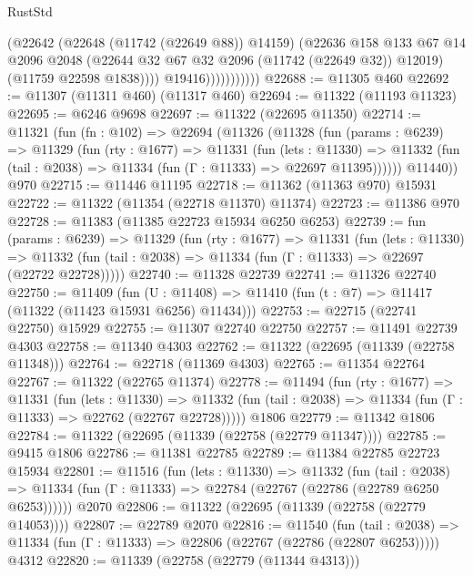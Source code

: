 \begin{lexlean}{RustStd}
\begin{coremodule}
                            (@22642
                              (@22648 (@11742 (@22649 @88)) @14159)
                              (@22636
                                @158
                                @133
                                @67
                                @14
                                @2096
                                @2048
                                (@22644 @32 @67 @32 @2096 (@11742 (@22649 @32)) @12019)
                                (@11759 @22598 @1838))))
                          @19416)))))))))))
@22688 := @11305 @460
@22692 := @11307 (@11311 @460) (@11317 @460)
@22694 := @11322 (@11193 @11323)
@22695 := @6246 @9698
@22697 := @11322 (@22695 @11350)
@22714 := @11321
    (fun (fn : @102) =>
    @22694
      (@11326
        (@11328
          (fun (params : @6239) =>
          @11329
            (fun (rty : @1677) =>
            @11331
              (fun (lets : @11330) =>
              @11332 (fun (tail : @2038) => @11334 (fun (Γ : @11333) => @22697 @11395))))))
        @11440))
    @970
@22715 := @11446 @11195
@22718 := @11362 (@11363 @970) @15931
@22722 := @11322 (@11354 (@22718 @11370) @11374)
@22723 := @11386 @970
@22728 := @11383 (@11385 @22723 @15934 @6250 @6253)
@22739 := fun (params : @6239) =>
  @11329
    (fun (rty : @1677) =>
    @11331
      (fun (lets : @11330) =>
      @11332 (fun (tail : @2038) => @11334 (fun (Γ : @11333) => @22697 (@22722 @22728)))))
@22740 := @11328 @22739
@22741 := @11326 @22740
@22750 := @11409
    (fun (U : @11408) => @11410 (fun (t : @7) => @11417 (@11322 (@11423 @15931 @6256) @11434)))
@22753 := @22715 (@22741 @22750) @15929
@22755 := @11307 @22740 @22750
@22757 := @11491 @22739 @4303
@22758 := @11340 @4303
@22762 := @11322 (@22695 (@11339 (@22758 @11348)))
@22764 := @22718 (@11369 @4303)
@22765 := @11354 @22764
@22767 := @11322 (@22765 @11374)
@22778 := @11494
    (fun (rty : @1677) =>
    @11331
      (fun (lets : @11330) =>
      @11332 (fun (tail : @2038) => @11334 (fun (Γ : @11333) => @22762 (@22767 @22728)))))
    @1806
@22779 := @11342 @1806
@22784 := @11322 (@22695 (@11339 (@22758 (@22779 @11347))))
@22785 := @9415 @1806
@22786 := @11381 @22785
@22789 := @11384 @22785 @22723 @15934
@22801 := @11516
    (fun (lets : @11330) =>
    @11332
      (fun (tail : @2038) =>
      @11334 (fun (Γ : @11333) => @22784 (@22767 (@22786 (@22789 @6250 @6253))))))
    @2070
@22806 := @11322 (@22695 (@11339 (@22758 (@22779 @14053))))
@22807 := @22789 @2070
@22816 := @11540
    (fun (tail : @2038) => @11334 (fun (Γ : @11333) => @22806 (@22767 (@22786 (@22807 @6253)))))
    @4312
@22820 := @11339 (@22758 (@22779 (@11344 @4313)))

\end{coremodule}
\end{lexlean}
